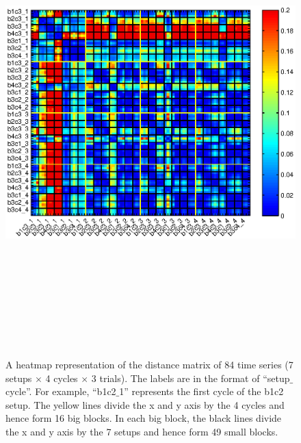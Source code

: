 \begin{figure}
\label{heatmap}
  \centering
  \includegraphics[width=18cm,height=18cm]{./fig_cha4/heatmap_all6_3.eps}
  \caption{ \scriptsize{A heatmap representation of the distance matrix of 84 time series (7 setups $\times$ 4 cycles $\times$ 3 trials). The labels are in the format of ``setup$\_$cycle''. For example, ``b1c2$\_$1'' represents the first cycle of the b1c2 setup. The yellow lines divide the x and y axis by the 4 cycles and hence form 16 big blocks. In each big block, the black lines divide the x and y axis by the 7 setups and hence form 49 small blocks. }
}
\label{fig:heatmap}
\end{figure}

